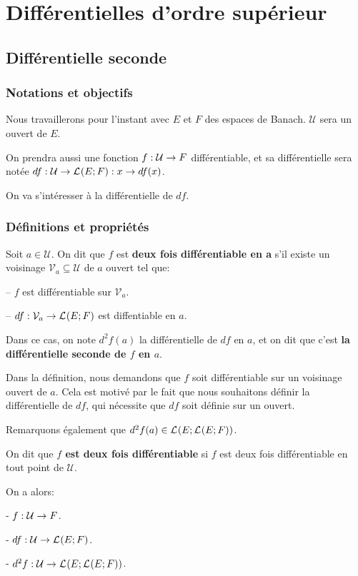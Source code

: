\chapter{Différentielles d'ordre supérieur}

\section{Différentielle seconde}

\subsection*{Notations et objectifs}
Nous travaillerons pour l'instant avec $E$ et $F$ des espaces de Banach.
$\mathcal{U}$ sera un ouvert de $E$.

On prendra aussi une fonction $f : \mathcal{U} \rightarrow F$ différentiable, et
sa différentielle sera notée
$df : \mathcal{U} \rightarrow \mathcal{L}_{}(E; F) : x \rightarrow df(x)$.

On va s'intéresser à la différentielle de $df$.

\subsection{Définitions et propriétés}

\begin{definition}
	Soit $a \in \mathcal{U}$. On dit que $f$ est \textbf{deux fois
	différentiable en a} s'il existe un voisinage $\mathcal{V}_{a} \subseteq
	\mathcal{U}$ de $a$ ouvert tel que:

	-- $f$ est différentiable sur $\mathcal{V}_{a}$.

	-- $df : \mathcal{V}_{a} \rightarrow \mathcal{L}_{}(E; F)$ est diffentiable
	en $a$.

	Dans ce cas, on note $d^{2}f(a)$ la différentielle de $df$ en $a$, et on dit
	que c'est \textbf{la différentielle seconde de $f$ en $a$}.
\end{definition}

Dans la définition, nous demandons que $f$ soit différentiable sur un
voisinage ouvert de $a$. Cela est motivé par le fait que nous souhaitons définir
la différentielle de $df$, qui nécessite que $df$ soit définie sur un ouvert.

Remarquons également que $d^{2}f(a) \in
\mathcal{L}_{}(E; \mathcal{L}_{}(E; F))$.

\begin{definition}
	On dit que \textbf{$f$ est deux fois différentiable} si $f$ est deux fois
	différentiable en tout point de $\mathcal{U}$.

	On a alors:

	- $f : \mathcal{U} \rightarrow F$.

	- $df : \mathcal{U} \rightarrow \mathcal{L}_{}(E; F)$.

	- $d^{2}f : \mathcal{U} \rightarrow \mathcal{L}_{}(E; \mathcal{L}_{}(E; F))$.
\end{definition}

